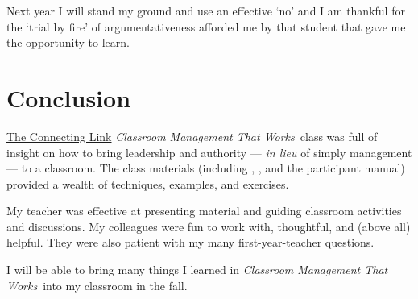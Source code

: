 \documentclass[11pt,twocolumn]{article}%
\def\foreign{\em}
\def\cmtw{{\em Classroom Management That Works}}
\begin{document}
Next year I will stand my ground and use an effective `no' and I am
thankful for the `trial by fire' of argumentativeness afforded me by
that student that gave me the opportunity to learn.

\section{Conclusion}
\label{Conclusion}

\href{http://connectinglink.com}{The Connecting Link} \cmtw\ class
was full of insight on how to bring leadership and authority
--- {\foreign in lieu} of simply management --- to a classroom. The
class materials (including \cite{book:ccm}, \cite{book:rcm}, and the
participant manual) provided a wealth of techniques, examples, and
exercises.

My teacher was effective at presenting material and guiding
classroom activities and discussions. My colleagues were fun to work
with, thoughtful, and (above all) helpful. They were also patient
with my many first-year-teacher questions.

I will be able to bring many things I learned in \cmtw\ into my
classroom in the fall.

\end{document}
